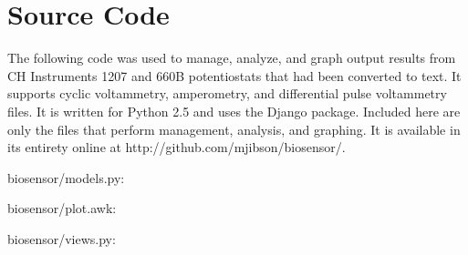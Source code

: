 \appendix
\chapter{Source Code}

The following code was used to manage, analyze, and graph output results from CH Instruments 1207 and 660B potentiostats that had been converted to text. It supports cyclic voltammetry, amperometry, and differential pulse voltammetry files. It is written for Python 2.5 and uses the Django package. Included here are only the files that perform management, analysis, and graphing. It is available in its entirety online at http://github.com/mjibson/biosensor/.

\singlespacing
\lstset{language=Python,basicstyle=\tiny,breaklines,tabsize=2}

biosensor/models.py:


biosensor/plot.awk:


biosensor/views.py:

